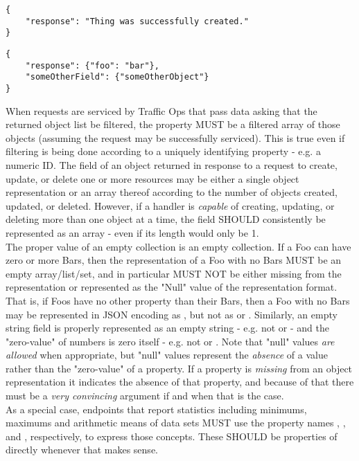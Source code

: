 \begin{codelisting}
\label{code:badresponseexample:success-as-response}
\begin{verbatim}
{
	"response": "Thing was successfully created."
}
\end{verbatim}
\end{codelisting}

\begin{codelisting}
\label{code:badresponseexample:extra-field}
\begin{verbatim}
{
	"response": {"foo": "bar"},
	"someOtherField": {"someOtherObject"}
}
\end{verbatim}
\end{codelisting}

When requests are serviced by Traffic Ops that pass data asking that the returned object list be filtered, the  property
MUST be a filtered array of those objects (assuming the request may be successfully serviced). This is true even if filtering is being
done according to a uniquely identifying property - e.g. a numeric ID. The  field of an object returned in response to a
request to create, update, or delete one or more resources may be either a single object representation or an array thereof according to
the number of objects created, updated, or deleted. However, if a handler is \emph{capable} of creating, updating, or deleting more than
one object at a time, the  field SHOULD consistently be represented as an array - even if its length would only be 1.\\
The proper value of an empty collection is an empty collection. If a Foo can have zero or more Bars, then the representation of a Foo with
no Bars MUST be an empty array/list/set, and in particular MUST NOT be either missing from the representation or represented as the "Null"
value of the representation format. That is, if Foos have no other property than their Bars, then a Foo with no Bars may be represented
in JSON encoding as , but not as  or \code{\{\}}. Similarly, an empty string field is properly
represented as an empty string - e.g.  not  or \code{\{\}} - and the "zero-value" of numbers is
zero itself - e.g.  not  or \code{\{\}}. Note that "null" values \emph{are allowed} when
appropriate, but "null" values represent the \emph{absence} of a value rather than the "zero-value" of a property. If a property is
\emph{missing} from an object representation it indicates the absence of that property, and because of that there must be a \emph{very
convincing} argument if and when that is the case.\\
As a special case, endpoints that report statistics including minimums,
maximums and arithmetic means of data sets MUST use the property names
, , and , respectively, to express those
concepts. These SHOULD be properties of  directly whenever that
makes sense.

